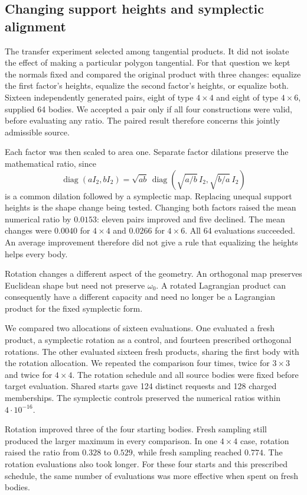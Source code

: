 \subsection{Changing support heights and symplectic alignment}

The transfer experiment selected among tangential products. It did not
isolate the effect of making a particular polygon tangential. For that
question we kept the normals fixed and compared the original product with
three changes: equalize the first factor's heights, equalize the second
factor's heights, or equalize both. Sixteen independently generated pairs,
eight of type $4\times4$ and eight of type $4\times6$, supplied 64 bodies.
We accepted a pair only if all four constructions were valid, before
evaluating any ratio. The paired result therefore concerns this jointly
admissible source.

Each factor was then scaled to area one. Separate factor dilations preserve
the mathematical ratio, since
\[
 \operatorname{diag}(aI_2,bI_2)
 =\sqrt{ab}\,\operatorname{diag}(\sqrt{a/b}\,I_2,\sqrt{b/a}\,I_2)
\]
is a common dilation followed by a symplectic map. Replacing unequal support
heights is the shape change being tested. Changing both factors raised the
mean numerical ratio by $0.0153$: eleven pairs improved and five declined.
The mean changes were $0.0040$ for $4\times4$ and $0.0266$ for $4\times6$.
All 64 evaluations succeeded. An average improvement therefore did not give
a rule that equalizing the heights helps every body.

Rotation changes a different aspect of the geometry. An orthogonal map
preserves Euclidean shape but need not preserve $\omega_0$. A rotated
Lagrangian product can consequently have a different capacity and need no
longer be a Lagrangian product for the fixed symplectic form.

We compared two allocations of sixteen evaluations. One evaluated a fresh
product, a symplectic rotation as a control, and fourteen prescribed
orthogonal rotations. The other evaluated sixteen fresh products, sharing
the first body with the rotation allocation. We repeated the comparison
four times, twice for $3\times3$ and twice for $4\times4$. The rotation
schedule and all source bodies were fixed before target evaluation. Shared
starts gave 124 distinct requests and 128 charged memberships. The
symplectic controls preserved the numerical ratios within $4\cdot10^{-16}$.

Rotation improved three of the four starting bodies. Fresh sampling still
produced the larger maximum in every comparison. In one $4\times4$ case,
rotation raised the ratio from $0.328$ to $0.529$, while fresh sampling
reached $0.774$. The rotation evaluations also took longer. For these four
starts and this prescribed schedule, the same number of evaluations was
more effective when spent on fresh bodies.


